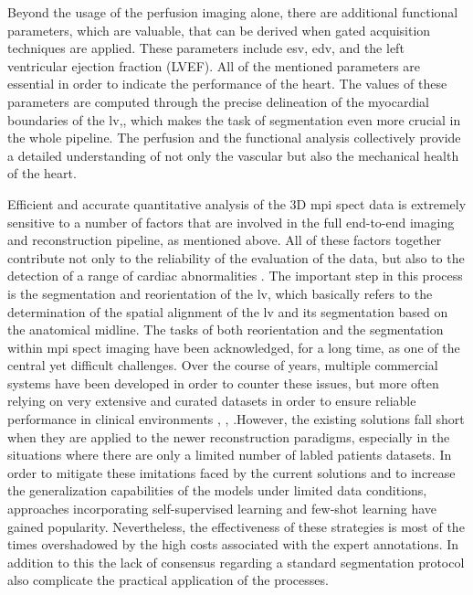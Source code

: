 Beyond the usage of the perfusion imaging alone, there are additional functional parameters, which are valuable, that can be derived when gated acquisition techniques are applied. These parameters include \gls{esv}, \gls{edv}, and the left ventricular ejection fraction (LVEF). All of the mentioned parameters are essential in order to indicate the performance of the heart. The values of these parameters are computed through the precise delineation of the myocardial boundaries of the \gls{lv},, which makes the task of segmentation even more crucial in the whole pipeline. The perfusion and the functional analysis collectively provide a detailed understanding of not only the vascular but also the mechanical health of the heart.

Efficient and accurate quantitative analysis of the 3D \gls{mpi} \gls{spect} data is extremely sensitive to a number of factors that are involved in the full end-to-end imaging and reconstruction pipeline, as mentioned above. All of these factors together contribute not only to the reliability of the evaluation of the data, but also to the detection of a range of cardiac abnormalities \cite{SLOMKA2012338}. The important step in this process is the segmentation and reorientation of the \gls{lv}, which basically refers to the determination of the spatial alignment of the \gls{lv} and its segmentation based on the anatomical midline. The tasks of both reorientation and the segmentation within \gls{mpi} \gls{spect} imaging have been acknowledged, for a long time, as one of the central yet difficult challenges. Over the course of years, multiple commercial systems have been developed in order to counter these issues, but more often relying on very extensive and curated datasets in order to ensure reliable performance in clinical environments \cite{Garcia2007}, \cite{Liu2007}, \cite{Ficaro2007}.However, the existing solutions fall short when they are applied to the newer reconstruction paradigms, especially in the situations where there are only a limited number of labled patients datasets. In order to mitigate these imitations faced by the current solutions and to increase the generalization capabilities of the models under limited data conditions, approaches incorporating self-supervised learning and few-shot learning have gained popularity. Nevertheless, the effectiveness of these strategies is most of the times overshadowed by the high costs associated with the expert annotations. In addition to this the lack of consensus regarding a standard segmentation protocol also complicate the practical application of the processes.

